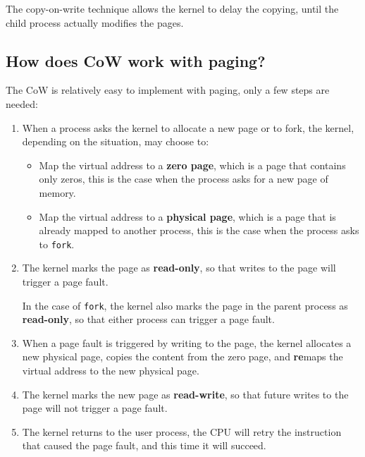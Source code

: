 The copy-on-write technique allows the kernel to delay the copying,
until the child process actually modifies the pages.


\subsection{How does CoW work with paging?}

The CoW is relatively easy to implement with paging, only a few steps are needed:

\begin{enumerate}
    \item When a process asks the kernel to allocate a new page or to fork, the kernel,
          depending on the situation, may choose to:
          \begin{itemize}
              \item Map the virtual address to a \textbf{zero page}, which is a
                    page that contains only zeros, this is the case when the
                    process asks for a new page of memory.
              \item Map the virtual address to a \textbf{physical page}, which is
                    a page that is already mapped to another process, this is the
                    case when the process asks to \texttt{fork}.
          \end{itemize}
    \item The kernel marks the page as \textbf{read-only}, so that
          writes to the page will trigger a page fault.

          In the case of \texttt{fork}, the kernel also marks the page in
          the parent process as \textbf{read-only}, so that either process
          can trigger a page fault.

    \item When a page fault is triggered by writing to the page, the
          kernel allocates a new physical page, copies the content from the
          zero page, and \textbf{re}maps the virtual address to the new physical page.
    \item The kernel marks the new page as \textbf{read-write}, so that
          future writes to the page will not trigger a page fault.
    \item The kernel returns to the user process, the CPU will retry
          the instruction that caused the page fault, and this time it will
          succeed.
\end{enumerate}

